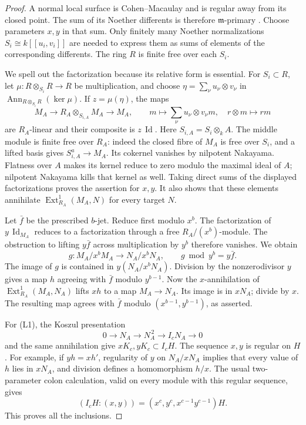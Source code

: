 \begin{proof}
A normal local surface is Cohen--Macaulay and is regular away from its
closed point. The sum of its Noether differents is therefore
\(\mathfrak m\)-primary
\cite[Theorem 1.1(1), definition on p.~298 and proof on p.~300]
{DaoTakahashi2015B}. Choose parameters \(x,y\) in that sum.
Only finitely many Noether normalizations \(S_i\cong k[[u_i,v_i]]\)
are needed to express them as sums of elements of the corresponding
differents. The ring \(R\) is finite free over each \(S_i\).

We spell out the factorization because its relative form is essential.
For \(S_i\subset R\), let \(\mu:R\otimes_{S_i}R\to R\) be multiplication,
and choose
\(\eta=\sum_\nu u_\nu\otimes v_\nu\) in
\(\operatorname{Ann}_{R\otimes_{S_i}R}(\ker\mu)\).
If \(z=\mu(\eta)\), the maps
\[
 M_A\longrightarrow R_A\otimes_{S_{i,A}}M_A
       \longrightarrow M_A,\qquad
 m\longmapsto\sum_\nu u_\nu\otimes v_\nu m,\quad
 r\otimes m\longmapsto rm
\]
are \(R_A\)-linear and their composite is \(z\,\operatorname{Id}\).
Here \(S_{i,A}=S_i\otimes_k A\).
The middle module is finite free over \(R_A\): indeed the closed fibre
of \(M_A\) is free over \(S_i\), and a lifted basis gives
\(S_{i,A}^{a}\to M_A\). Its cokernel vanishes by nilpotent Nakayama.
Flatness over \(A\) makes its kernel reduce to zero modulo the maximal
ideal of \(A\); nilpotent Nakayama kills that kernel as well.
Taking direct sums of the displayed factorizations proves the assertion
for \(x,y\). It also shows that these elements annihilate
\(\operatorname{Ext}^1_{R_A}(M_A,N)\) for every target \(N\).

Let \(\bar f\) be the prescribed \(b\)-jet. Reduce first modulo \(x^b\).
The factorization of \(y\,\operatorname{Id}_{M_A}\) reduces to a
factorization through a free \(R_A/(x^b)\)-module. The obstruction to
lifting \(y\bar f\) across multiplication by \(y^b\) therefore vanishes.
We obtain
\[
 g:M_A/x^bM_A\longrightarrow N_A/x^bN_A,\qquad
 g\bmod y^b=y\bar f.
\]
The image of \(g\) is contained in \(y(N_A/x^bN_A)\).
Division by the nonzerodivisor \(y\) gives a map \(h\) agreeing with
\(\bar f\) modulo \(y^{b-1}\). Now the \(x\)-annihilation of
\(\operatorname{Ext}^1_{R_A}(M_A,N_A)\) lifts \(xh\) to a map
\(M_A\to N_A\). Its image is in \(xN_A\); divide by \(x\).
The resulting map agrees with \(\bar f\) modulo
\((x^{b-1},y^{b-1})\), as asserted.

For (L1), the Koszul presentation
\[
 0\longrightarrow N_A\longrightarrow N_A^{\,2}
       \longrightarrow I_cN_A\longrightarrow0
\]
and the same annihilation give
\(xK_c,yK_c\subset I_cH\).
The sequence \(x,y\) is regular on \(H\). For example, if \(yh=xh'\),
regularity of \(y\) on \(N_A/xN_A\) implies that every value of \(h\)
lies in \(xN_A\), and division defines a homomorphism \(h/x\).
The usual two-parameter colon calculation, valid on every module
with this regular sequence, gives
\[
 (I_cH:(x,y))=(x^c,y^c,x^{c-1}y^{c-1})H.
\]
This proves all the inclusions.
\end{proof}

